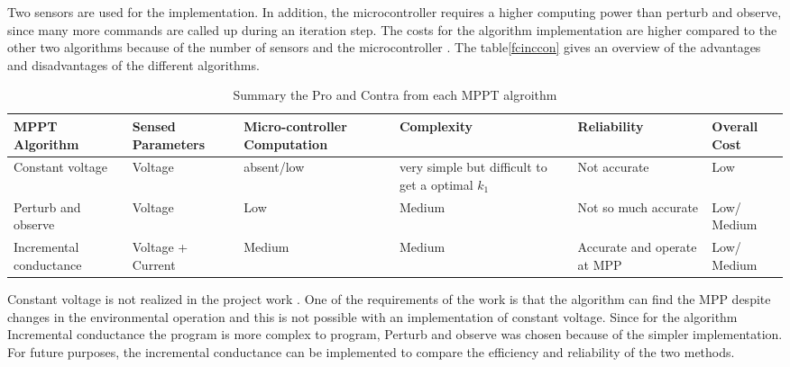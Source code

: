 Two sensors are used for the implementation. In addition, the microcontroller requires a higher computing power than perturb and observe, since many more commands are called up during an iteration step. The costs for the algorithm implementation are higher compared to the other two algorithms because of the number of sensors and the microcontroller . \newline
The table\ref{fcinccon} gives an overview of the advantages and disadvantages of the different algorithms.
\begin{table}[H]
	\centering 
		\begin{tabular}{|>{\centering}p{2cm}|>{\centering}p{2cm}|>{\centering}p{2cm}|>{\centering}p{2cm}|>{\centering}p{2cm}|>{\centering}p{2cm}|}
		\hline
		\rowcolor{lightgray}						 \textbf{MPPT Algorithm} & 	
		 \textbf{Sensed Parameters} &
		\textbf{Micro-controller Computation} &
		 \textbf{Complexity}&
		 \textbf{Reliability}	&
		 \textbf{Overall Cost}
		\tabularnewline  \hline
			Constant voltage 	& Voltage 		& absent/low &  very simple but difficult to get a optimal $k_{1}$& Not accurate & Low 										\tabularnewline \hline
			Perturb and observe & Voltage  & Low  &  Medium & Not so much accurate & Low/ Medium 		\tabularnewline \hline
			Incremental conductance & Voltage + Current & Medium &  Medium & Accurate and operate at MPP & Low/ Medium	\tabularnewline	\hline
		
		\end{tabular}
	\caption{Summary the Pro and Contra from each MPPT algroithm \cite{} }
	\label{tab:summaryMPPT}
\end{table}
Constant voltage is not realized in the project work . One of the requirements of the work is that the algorithm can find the MPP despite changes in the environmental operation and this is not possible with an implementation of constant voltage. Since for the algorithm Incremental conductance the program is more complex to program, Perturb and observe was chosen because of the simpler implementation. For future purposes, the incremental conductance can be implemented to compare the efficiency and reliability of the two methods.


